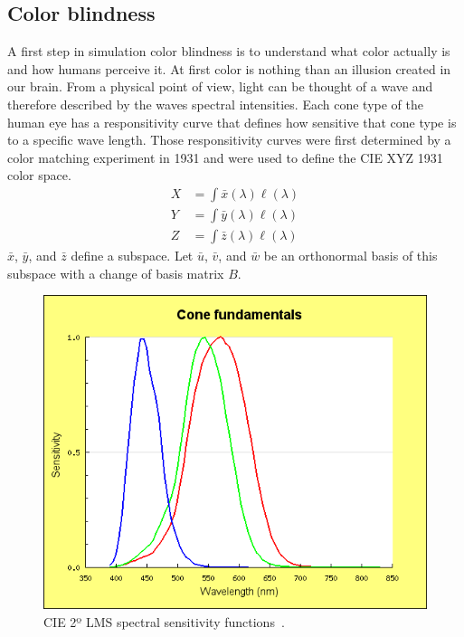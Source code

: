 \documentclass{acm_proc_article-sp}
\begin{document}
\subsection{Color blindness}
A first step in simulation color blindness is to understand what color actually is and how humans perceive it.
At first color is nothing than an illusion created in our brain.
From a physical point of view, light can be thought of a wave and therefore described by the waves spectral intensities.
Each cone type of the human eye has a responsitivity curve that defines how sensitive that cone type is to a specific wave length.
Those responsitivity curves were first determined by a color matching experiment in 1931 and were used to define the CIE XYZ 1931 color space.
\begin{eqnarray}
    X &= \int\bar x(\lambda) \ell(\lambda) \\
    Y &= \int\bar y(\lambda) \ell(\lambda) \\
    Z &= \int\bar z(\lambda) \ell(\lambda)
\end{eqnarray}
%
$\bar x$, $\bar y$, and $\bar z$ define a subspace.
Let $\bar u$, $\bar v$, and $\bar w$ be an orthonormal basis of this subspace with a change of basis matrix $B$.
%
%
\begin{figure}
    \includegraphics[width=\columnwidth]{lms-sensitivity.png}
    \caption{CIE 2º LMS spectral sensitivity functions~\cite{cvrl-lms-web}.}
    \label{fig:lmscurves}
\end{figure}
%
%
\end{document}
